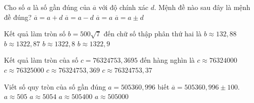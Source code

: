 \begin{ex}%
	Cho số $a$ là số gần đúng của $\overline{a}$ với độ chính xác $d$. Mệnh đề nào sau đây là mệnh đề đúng?
	\choice
	{$\overline{a}=a+d$}
	{$\overline{a}=a-d$}
	{$\overline{a}=a$}	
	{\True $\overline{a}=a\pm d$}
\end{ex}

\begin{ex}%
	Kết quả làm tròn số $b=500\sqrt{7}$ đến chữ số thập phân thứ hai là
	\choice
	{\True $b\approx 132,88$}
	{$b\approx 1322,87$}
	{$b\approx 1322,8 $}
	{$b\approx 1322,9 $}
\end{ex}

\begin{ex}%
	Kết quả làm tròn của số $c=76324753{,}3695$ đến  hàng nghìn là
	\choice
	{$c\approx 76324000$}
	{\True $c\approx 76325000$}
	{$c\approx 76324753{,}369$}
	{$c\approx 76324753{,}37$}
\end{ex}

\begin{ex}%
	Viết số quy tròn của số gần đúng $a=505360{,}996$ biết $\overline{a}=505360{,}996\pm 100$.
	\choice
	{$a\approx 505$}
	{$a\approx 5054$}
	{$a\approx 505400$}
	{\True $a\approx 505000$}
\end{ex}



